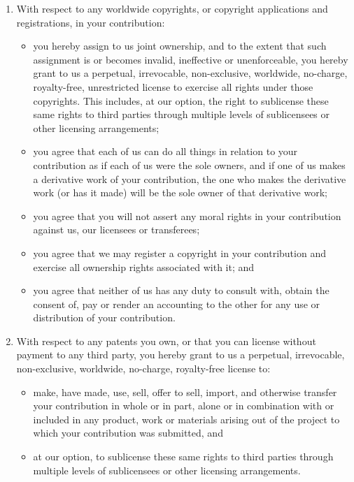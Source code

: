 \documentclass[12pt,a4paper,twoside,openright]{report}
\begin{document}
\begin{enumerate}[noitemsep,topsep=0pt]
    \item With respect to any worldwide copyrights, or copyright applications and registrations, in your contribution:
    \begin{itemize}[noitemsep,topsep=0pt]
        \item you hereby assign to us joint ownership, and to the extent that such assignment is or becomes invalid, ineffective or unenforceable, you hereby grant to us a perpetual, irrevocable, non-exclusive, worldwide, no-charge, royalty-free, unrestricted license to exercise all rights under those copyrights. This includes, at our option, the right to sublicense these same rights to third parties through multiple levels of sublicensees or other licensing arrangements;
        \item you agree that each of us can do all things in relation to your contribution as if each of us were the sole owners, and if one of us makes a derivative work of your contribution, the one who makes the derivative work (or has it made) will be the sole owner of that derivative work;
        \item you agree that you will not assert any moral rights in your contribution against us, our licensees or transferees;
        \item you agree that we may register a copyright in your contribution and exercise all ownership rights associated with it; and
        \item you agree that neither of us has any duty to consult with, obtain the consent of, pay or render an accounting to the other for any use or distribution of your contribution.
    \end{itemize}
    \item With respect to any patents you own, or that you can license without payment to any third party, you hereby grant to us a perpetual, irrevocable, non-exclusive, worldwide, no-charge, royalty-free license to:
    \begin{itemize}[noitemsep,topsep=0pt]
        \item make, have made, use, sell, offer to sell, import, and otherwise transfer your contribution in whole or in part, alone or in combination with or included in any product, work or materials arising out of the project to which your contribution was submitted, and
        \item at our option, to sublicense these same rights to third parties through multiple levels of sublicensees or other licensing arrangements.
    \end{itemize}


\end{enumerate}
\end{document}
